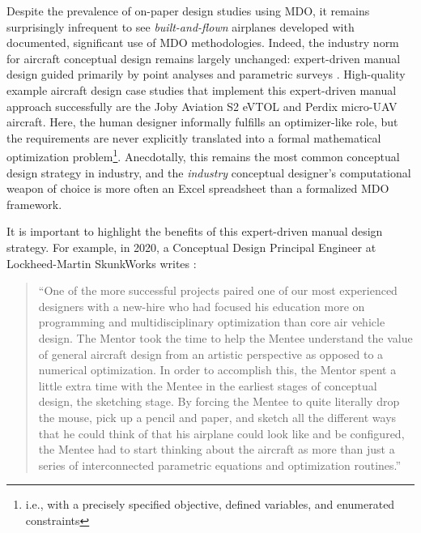 

Despite the prevalence of on-paper design studies using MDO, it remains surprisingly infrequent to see \textit{built-and-flown} airplanes developed with documented, significant use of MDO methodologies. Indeed, the industry norm for aircraft conceptual design remains largely unchanged: expert-driven manual design guided primarily by point analyses and parametric surveys \cite{gudmundsson_general_2014, nicolai_fundamentals_2010, raymer_aircraft_2018}. High-quality example aircraft design case studies that implement this expert-driven manual approach successfully are the Joby Aviation S2 eVTOL \cite{stoll_conceptual_2014} and Perdix micro-UAV \cite{tao_design_2012} aircraft. Here, the human designer informally fulfills an optimizer-like role, but the requirements are never explicitly translated into a formal mathematical optimization problem\footnote{i.e., with a precisely specified objective, defined variables, and enumerated constraints}. Anecdotally, this remains the most common conceptual design strategy in industry, and the \textit{industry} conceptual designer's computational weapon of choice is more often an Excel spreadsheet than a formalized MDO framework.

It is important to highlight the benefits of this expert-driven manual design strategy. For example, in 2020, a Conceptual Design Principal Engineer at Lockheed-Martin SkunkWorks writes \cite{walton_cd_2020}:

\begin{quote}
    ``One of the more successful projects paired one of our most experienced designers with a new-hire who had focused his education more on programming and multidisciplinary optimization than core air vehicle design. The Mentor took the time to help the Mentee understand the value of general aircraft design from an artistic perspective as opposed to a numerical optimization. In order to accomplish this, the Mentor spent a little extra time with the Mentee in the earliest stages of conceptual design, the sketching stage. By forcing the Mentee to quite literally drop the mouse, pick up a pencil and paper, and sketch all the different ways that he could think of that his airplane could look like and be configured, the Mentee had to start thinking about the aircraft as more than just a series of interconnected parametric equations and optimization routines.''
\end{quote}

